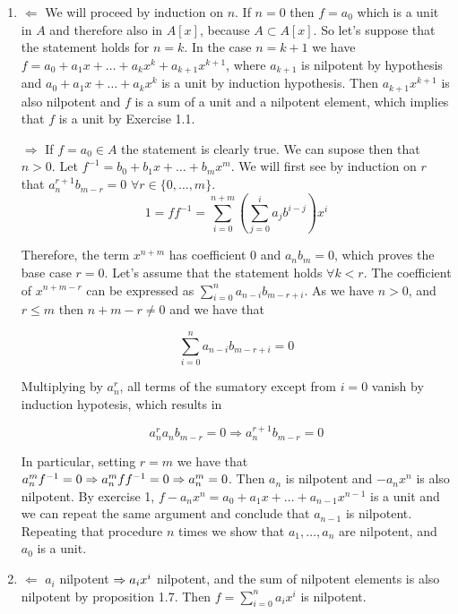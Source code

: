 \begin{sol}
\begin{enumerate}[label=(\roman*)]
	\item $\boxed{\Leftarrow}$ We will proceed by induction on $n$. If $n = 0$ then $f = a_0$ which is a unit in $A$ and therefore also in $A[x]$, because $A \subset A[x]$. So let's suppose that the statement holds for $n = k$. In the case $n = k+1$ we have $f = a_0 + a_1x + \dots + a_k x^k + a_{k+1}x^{k+1}$, where $a_{k+1}$ is nilpotent by hypothesis and $a_0 + a_1x + \dots + a_k x^k$ is a unit by induction hypothesis. Then $a_{k+1} x^{k+1}$ is also nilpotent and $f$ is a sum of a unit and a nilpotent element, which implies that $f$ is a unit by Exercise 1.1. 

	$\boxed{\Rightarrow}$ If $f = a_0 \in A$ the statement is clearly true. We can supose then that $n > 0$. Let $f^{-1} = b_0 + b_1 x + \dots + b_mx^m$. We will first see by induction on $r$ that $a_n^{r+1} b_{m-r} = 0 \, \, \forall r \in \{0, \dots , m \}$. 
	\[
	1 = ff^{-1} = \sum_{i = 0}^{n+m} \left ( \sum_{j = 0}^i a_j b^{i-j} \right ) x^i
	\]

	Therefore, the term $x^{n+m}$ has coefficient 0 and $a_n b_m = 0$, which proves the base case $r = 0$. Let's assume that the statement holds $ \forall k < r$. The coefficient of $x^{n+m-r}$ can be expressed as $\sum_{i = 0}^{n} a_{n-i} b_{m-r+i}$. As we have $n > 0$, and $r \leq m$ then $n+m-r \neq 0$ and we have that

	\[
		\sum_{i = 0}^{n} a_{n-i} b_{m-r+i} = 0
	\]
	
	Multiplying by $a_n^r$, all terms of the sumatory except from $i = 0$ vanish by induction hypotesis, which results in

	\[
		a_n^r a_{n} b_{m-r} = 0 \Rightarrow a_n^{r+1}b_{m-r} = 0
	\]

	In particular, setting $r = m$ we have that $a_n^m f^{-1} = 0 \Rightarrow a_n^m ff^{-1} = 0 \Rightarrow a_n^m = 0$. Then $a_n$ is nilpotent and $-a_nx^n$ is also nilpotent. By exercise 1, $f-a_n x^n = a_0 + a_1 x + \dots + a_{n-1} x^{n-1}$ is a unit and we can repeat the same argument and conclude that $a_{n-1}$ is nilpotent. Repeating that procedure $n$ times we show that $a_1, \dots, a_n$ are nilpotent, and $a_0$ is a unit.
	


	\item $\boxed{\Leftarrow}$ $a_i$ nilpotent $\Rightarrow a_i x^i$ nilpotent, and the sum of nilpotent elements is also nilpotent by proposition 1.7. Then $f = \sum_{i=0}^n a_i x^i$ is nilpotent.


\end{enumerate}
\end{sol}
